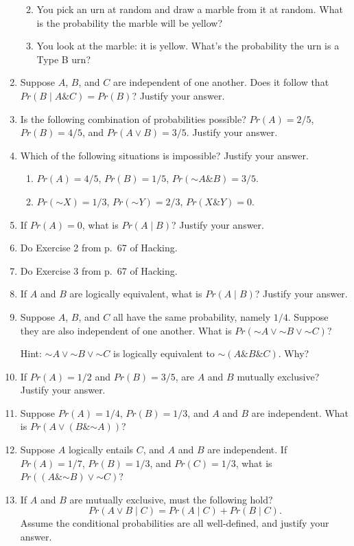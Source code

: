 \documentclass[justified]{tufte-book}
\providecommand{\tightlist}{%
  \setlength{\itemsep}{0pt}\setlength{\parskip}{0pt}}
\newcommand{\given}{\mid}
\renewcommand{\neg}{\mathbin{\sim}}
\renewcommand{\wedge}{\mathbin{\&}}
\newcommand{\p}{Pr}
\theoremstyle{definition}
\theoremstyle{definition}
\theoremstyle{definition}
\theoremstyle{remark}
\begin{document}
\begin{enumerate}
  \begin{enumerate}
  \def\labelenumii{\alph{enumii}.}
  \tightlist
  \item
    You pick an urn at random and draw a marble from it at random. What is the probability the marble will be yellow?
  \item
    You look at the marble: it is yellow. What's the probability the urn is a Type B urn?
  \end{enumerate}
\item
  Suppose \(A\), \(B\), and \(C\) are independent of one another. Does it follow that \(\p(B \given A \wedge C) = \p(B)\)? Justify your answer.
\item
  Is the following combination of probabilities possible? \(Pr(A) = 2/5\), \(Pr(B) = 4/5\), and \(Pr(A \vee B) = 3/5\). Justify your answer.
\item
  Which of the following situations is impossible? Justify your answer.

  \begin{enumerate}
  \def\labelenumii{\alph{enumii}.}
  \tightlist
  \item
    \(\p(A) = 4/5\), \(\p(B) = 1/5\), \(\p(\neg A \wedge B) = 3/5\).
  \item
    \(\p(\neg X) = 1/3\), \(\p(\neg Y) = 2/3\), \(\p(X \wedge Y) = 0\).
  \end{enumerate}
\item
  If \(Pr(A)=0\), what is \(\p(A \given B)\)? Justify your answer.
\item
  Do Exercise 2 from p.~67 of Hacking.
\item
  Do Exercise 3 from p.~67 of Hacking.
\item
  If \(A\) and \(B\) are logically equivalent, what is \(\p(A \given B)\)? Justify your answer.
\item
  Suppose \(A\), \(B\), and \(C\) all have the same probability, namely \(1/4\). Suppose they are also independent of one another. What is \(\p(\neg A \vee \neg B \vee \neg C)\)?

  Hint: \(\neg A \vee \neg B \vee \neg C\) is logically equivalent to \(\neg (A \wedge B \wedge C)\). Why?
\item
  If \(\p(A) = 1/2\) and \(\p(B) = 3/5\), are \(A\) and \(B\) mutually exclusive? Justify your answer.
\item
  Suppose \(\p(A) = 1/4\), \(\p(B) = 1/3\), and \(A\) and \(B\) are independent. What is \(\p(A \vee (B \wedge \neg A))\)?
\item
  Suppose \(A\) logically entails \(C\), and \(A\) and \(B\) are independent. If \(\p(A) = 1/7\), \(\p(B) = 1/3\), and \(\p(C)=1/3\), what is \(\p((A \wedge \neg B) \vee \neg C)\)?
\item
  If \(A\) and \(B\) are mutually exclusive, must the following hold?
  \[\p(A \vee B \given C) = \p(A \given C) + \p(B \given C).\]
  Assume the conditional probabilities are all well-defined, and justify your answer.


\end{enumerate}
\end{document}
